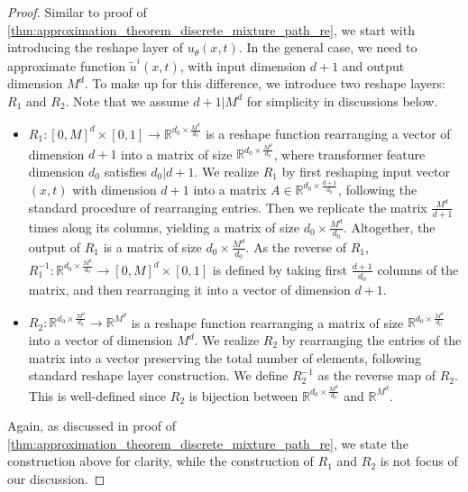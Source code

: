 \documentclass[12pt]{article}
\numberwithin{equation}{section}
\let\tilde\widetilde
\newcommand{\wt}{\widetilde}
\renewcommand{\tilde}{\wt}
\def\R{\mathbb{R}}
\theoremstyle{theoremstyle}
\numberwithin{equation}{section}
\numberwithin{theorem}{section}
\numberwithin{proposition}{section}
\numberwithin{definition}{section}
\numberwithin{lemma}{section}
\numberwithin{assumption}{section}
\numberwithin{remark}{section}
\begin{document}
\begin{proof}
Similar to proof of \cref{thm:approximation_theorem_discrete_mixture_path_re}, we start with introducing the reshape layer of $u_\theta(x,t)$.
In the general case, we need to approximate function $\tilde{u}^i(x,t)$, with input dimension $d+1$ and output dimension $M^d$.
To make up for this difference, we introduce two reshape layers: $R_1$ and $R_2$.
Note that we assume $d+1|M^d$ for simplicity in discussions below.

\begin{itemize}
\item $R_1:[0,M]^d\times[0,1]\to \R^{d_0\times \frac{M^d}{d_0}}$ is a reshape function rearranging a vector of dimension $d+1$ into a matrix of size $\R^{d_0\times \frac{M^d}{d_0}}$, where transformer feature dimension $d_0$ satisfies $d_0|d+1$.
We realize $R_1$ by first reshaping input vector $(x,t)$ with dimension $d+1$ into a matrix $A\in\R^{d_0\times \frac{d+1}{d_0}}$,  following the standard procedure of rearranging entries.
Then we replicate the matrix $\frac{M^d}{d+1}$ times along its columns, yielding a matrix of size $d_0\times \frac{M^d}{d_0}$.
Altogether, the output of $R_1$ is a matrix of size $d_0\times \frac{M^d}{d_0}$.
As the reverse of $R_1$, $R^{-1}_1:\R^{d_0\times \frac{M^d}{d_0}}\to[0,M]^d\times[0,1]$ is defined by taking first $\frac{d+1}{d_0}$ columns of the matrix, and then rearranging it into a vector of dimension $d+1$.

\item $R_2:\R^{d_0\times \frac{M^d}{d_0}}\to \R^{M^d}$ is a reshape function rearranging a matrix of size $\R^{d_0\times \frac{M^d}{d_0}}$ into a vector of dimension $M^d$.
We realize $R_2$ by rearranging the entries of the matrix into a vector preserving the total number of elements, following standard reshape layer construction.
We define $R_2^{-1}$ as the reverse map of $R_2$.
This is well-defined since $R_2$ is bijection between $\R^{d_0\times \frac{M^d}{d_0}}$ and $\R^{M^d}$.

\end{itemize}

Again, as discussed in proof of \cref{thm:approximation_theorem_discrete_mixture_path_re}, we state the construction above for clarity, while the construction of $R_1$ and $R_2$ is not focus of our discussion.


\end{proof}
\end{document}
